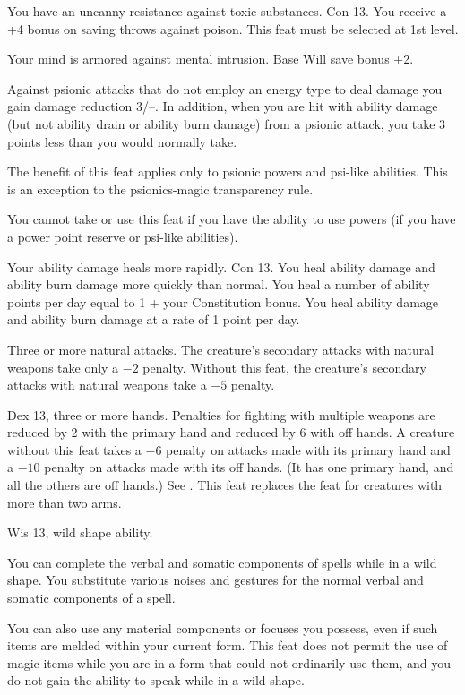 {You have an uncanny resistance against toxic substances.}
{Con 13.}
{You receive a +4 bonus on saving throws against poison.}{}
{This feat must be selected at 1st level.}

{Your mind is armored against mental intrusion.}
{Base Will save bonus +2.}
{Against psionic attacks that do not employ an energy type to deal damage you gain damage reduction 3/--. In addition, when you are hit with ability damage (but not ability drain or ability burn damage) from a psionic attack, you take 3 points less than you would normally take.

The benefit of this feat applies only to psionic powers and psi-like abilities. This is an exception to the psionics-magic transparency rule.}{}
{You cannot take or use this feat if you have the ability to use powers (if you have a power point reserve or psi-like abilities).}

{Your ability damage heals more rapidly.}
{Con 13.}
{You heal ability damage and ability burn damage more quickly than normal. You heal a number of ability points per day equal to 1 + your Constitution bonus.}
{You heal ability damage and ability burn damage at a rate of 1 point per day.}{}

{}
{Three or more natural attacks.}
{The creature's secondary attacks with natural weapons take only a $-2$ penalty.}
{Without this feat, the creature's secondary attacks with natural weapons take a $-5$ penalty.}
{}

{}
{Dex 13, three or more hands.}
{Penalties for fighting with multiple weapons are reduced by 2 with the primary hand and reduced by 6 with off hands.}
{A creature without this feat takes a $-6$ penalty on attacks made with its primary hand and a $-10$ penalty on attacks made with its off hands. (It has one primary hand, and all the others are off hands.) See .}
{This feat replaces the  feat for creatures with more than two arms.}

{Wis 13, wild shape ability.}
{You can complete the verbal and somatic components of spells while in a wild shape. You substitute various noises and gestures for the normal verbal and somatic components of a spell.

You can also use any material components or focuses you possess, even if such items are melded within your current form. This feat does not permit the use of magic items while you are in a form that could not ordinarily use them, and you do not gain the ability to speak while in a wild shape.}

